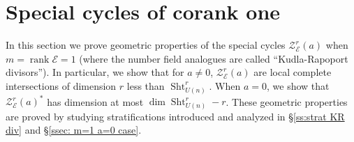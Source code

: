 \documentclass[reqno]{amsart}
\numberwithin{equation}{section}
\newcommand{\wt}[1]{\widetilde{#1}}
\DeclareMathOperator{\Frob}{Fr}
\DeclareMathOperator{\rank}{rank}
\DeclareMathOperator{\Id}{Id}
\DeclareMathOperator{\Sht}{Sht}
\DeclareMathOperator{\Hk}{Hk}
\DeclareMathOperator{\Ch}{Ch}
\renewcommand\c{\circ}
\newcommand{\z}{\zeta}
\newcommand\cA{\mathcal{A}}
\newcommand\cE{\mathcal{E}}
\newcommand\cM{\mathcal{M}}
\newcommand\cZ{\mathcal{Z}}
\theoremstyle{remark}
\numberwithin{equation}{section}
\begin{document}




\section{Special cycles of corank one}\label{ssec: geometric properties}

In this section we prove geometric properties of the special cycles $\cZ^{r}_{\cE}(a)$ when $m= \rank \cE = 1$ (where the number field analogues are called ``Kudla-Rapoport divisors''). In particular, we show that for $a\ne0$, $\cZ^{r}_{\cE}(a)$  are local complete intersections of dimension $r$ less than $\Sht^{r}_{U(n)}$.  When $a=0$,  we show that  $\cZ^{r}_{\cE}(a)^{*}$ has dimension at most $\dim\Sht^{r}_{U(n)}-r$. These geometric properties are proved by studying stratifications introduced and analyzed in \S \ref{ss:strat KR div} and \S \ref{ssec: m=1 a=0 case}.

\end{document}
